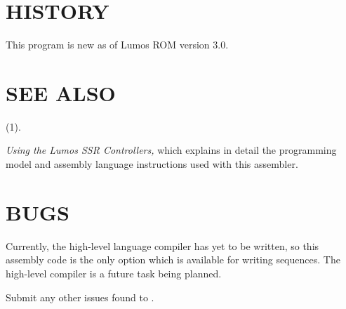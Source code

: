 \section*{HISTORY}


This program is new as of Lumos ROM version 3.0.
\section*{SEE ALSO}
(1).


\emph{Using the Lumos SSR Controllers,}
which explains in detail the programming model and assembly language instructions
used with this assembler.
\section*{BUGS}


Currently, the high-level language compiler has yet to be written, so this assembly
code is the only option which is available for writing sequences.  The high-level
compiler is a future task being planned.


Submit any other issues found to 
.
